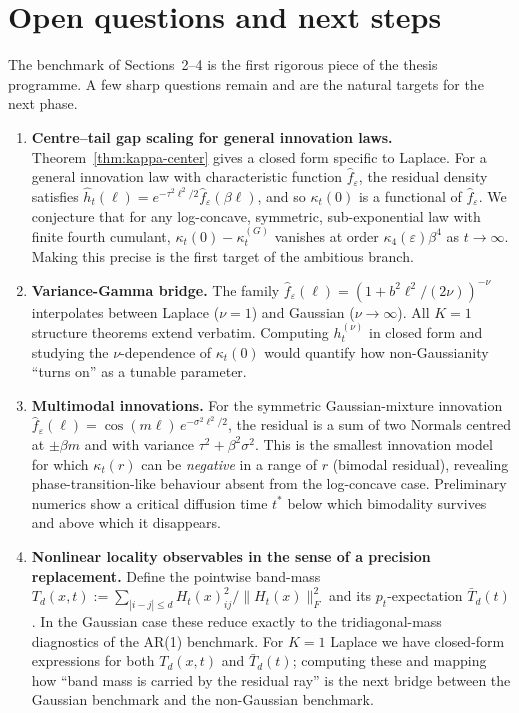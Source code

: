 \documentclass[11pt,a4paper]{article}
\theoremstyle{plainserif}
\theoremstyle{definition}
\theoremstyle{remarkstyle}
\newcommand{\hatfn}[1]{\widehat{#1}}
\begin{document}
\section{Open questions and next steps}

The benchmark of Sections~2--4 is the first rigorous piece of the thesis
programme. A few sharp questions remain and are the natural targets
for the next phase.

\begin{enumerate}[leftmargin=2em]
\item \textbf{Centre--tail gap scaling for general innovation laws.}
Theorem~\ref{thm:kappa-center} gives a closed form specific to Laplace.
For a general innovation law with characteristic function $\hatfn f_\varepsilon$,
the residual density satisfies
$\hatfn h_t(\ell) = e^{-\tau^2\ell^2/2}\hatfn f_\varepsilon(\beta\ell)$, and so
$\kappa_t(0)$ is a functional of $\hatfn f_\varepsilon$.
We conjecture that for any log-concave, symmetric, sub-exponential law with
finite fourth cumulant,
$\kappa_t(0) - \kappa_t^{(G)}$
vanishes at order $\kappa_4(\varepsilon)\beta^4$ as $t\to\infty$. Making
this precise is the first target of the ambitious branch.

\item \textbf{Variance-Gamma bridge.}
The family $\hatfn f_\varepsilon(\ell) = (1 + b^2\ell^2/(2\nu))^{-\nu}$
interpolates between Laplace ($\nu=1$) and Gaussian ($\nu\to\infty$).
All $K{=}1$ structure theorems extend verbatim. Computing $h_t^{(\nu)}$
in closed form and studying the $\nu$-dependence of $\kappa_t(0)$ would
quantify how non-Gaussianity ``turns on'' as a tunable parameter.

\item \textbf{Multimodal innovations.}
For the symmetric Gaussian-mixture innovation
$\hatfn f_\varepsilon(\ell) = \cos(m\ell)\,e^{-\sigma^2\ell^2/2}$, the residual
is a sum of two Normals centred at $\pm\beta m$ and with variance
$\tau^2+\beta^2\sigma^2$. This is the smallest innovation model for
which $\kappa_t(r)$ can be \emph{negative} in a range of $r$ (bimodal
residual), revealing phase-transition-like behaviour absent from the
log-concave case. Preliminary numerics show a critical diffusion time
$t^*$ below which bimodality survives and above which it disappears.

\item \textbf{Nonlinear locality observables in the sense of a precision
replacement.}
Define the pointwise band-mass
$T_d(x,t) := \sum_{|i-j|\leq d} H_t(x)_{ij}^2 / \|H_t(x)\|_F^2$
and its $p_t$-expectation $\bar T_d(t)$. In the Gaussian case these
reduce exactly to the tridiagonal-mass diagnostics of the AR(1)
benchmark. For $K{=}1$ Laplace we have closed-form expressions for
both $T_d(x,t)$ and $\bar T_d(t)$; computing these and mapping how
``band mass is carried by the residual ray'' is the next bridge
between the Gaussian benchmark and the non-Gaussian benchmark.


\end{enumerate}
\end{document}
